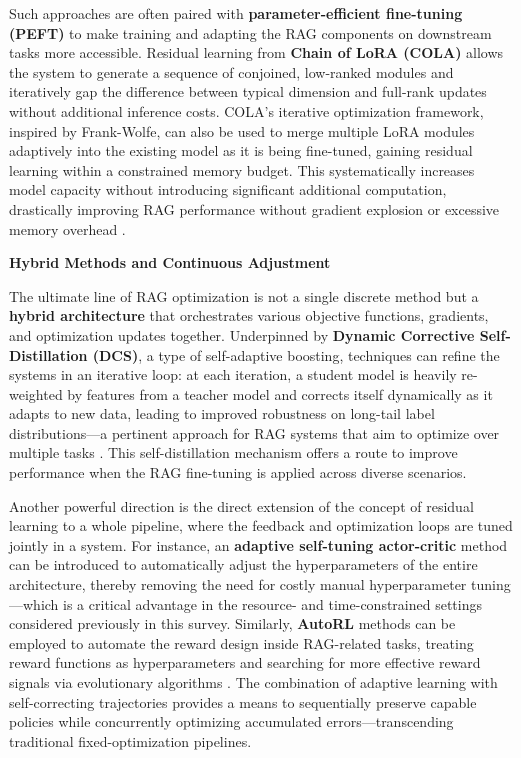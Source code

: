 \documentclass[11pt]{article}
\begin{document}
Such approaches are often paired with \textbf{parameter-efficient fine-tuning (PEFT)} to make training and adapting the RAG components on downstream tasks more accessible. Residual learning from \textbf{Chain of LoRA (COLA)} allows the system to generate a sequence of conjoined, low-ranked modules and iteratively gap the difference between typical dimension and full-rank updates without additional inference costs. COLA's iterative optimization framework, inspired by Frank-Wolfe, can also be used to merge multiple LoRA modules adaptively into the existing model as it is being fine-tuned, gaining residual learning within a constrained memory budget. This systematically increases model capacity without introducing significant additional computation, drastically improving RAG performance without gradient explosion or excessive memory overhead \cite{ref235}.

\textbf{Hybrid Methods and Continuous Adjustment}

The ultimate line of RAG optimization is not a single discrete method but a \textbf{hybrid architecture} that orchestrates various objective functions, gradients, and optimization updates together. Underpinned by \textbf{Dynamic Corrective Self-Distillation (DCS)}, a type of self-adaptive boosting, techniques can refine the systems in an iterative loop: at each iteration, a student model is heavily re-weighted by features from a teacher model and corrects itself dynamically as it adapts to new data, leading to improved robustness on long-tail label distributions---a pertinent approach for RAG systems that aim to optimize over multiple tasks \cite{ref236}. This self-distillation mechanism offers a route to improve performance when the RAG fine-tuning is applied across diverse scenarios.

Another powerful direction is the direct extension of the concept of residual learning to a whole pipeline, where the feedback and optimization loops are tuned jointly in a system. For instance, an \textbf{adaptive self-tuning actor-critic} method can be introduced to automatically adjust the hyperparameters of the entire architecture, thereby removing the need for costly manual hyperparameter tuning \cite{ref237}---which is a critical advantage in the resource- and time-constrained settings considered previously in this survey. Similarly, \textbf{AutoRL} methods can be employed to automate the reward design inside RAG-related tasks, treating reward functions as hyperparameters and searching for more effective reward signals via evolutionary algorithms \cite{ref227}. The combination of adaptive learning with self-correcting trajectories provides a means to sequentially preserve capable policies while concurrently optimizing accumulated errors---transcending traditional fixed-optimization pipelines.
\end{document}
